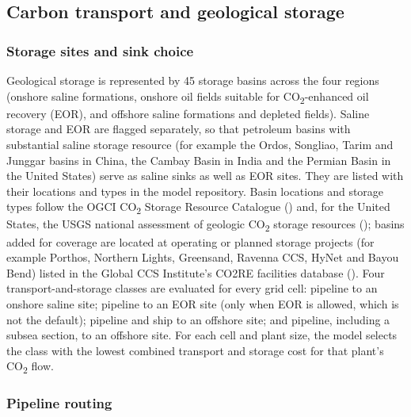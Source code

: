 \documentclass[
  letterpaper,
]{article}
\begin{document}
\subsection{Carbon transport and geological
storage}\label{carbon-transport-and-geological-storage}

\subsubsection{Storage sites and sink
choice}\label{storage-sites-and-sink-choice}

Geological storage is represented by 45 storage basins across the four
regions (onshore saline formations, onshore oil fields suitable for
CO\textsubscript{2}-enhanced oil recovery (EOR), and offshore saline
formations and depleted fields). Saline storage and EOR are flagged
separately, so that petroleum basins with substantial saline storage
resource (for example the Ordos, Songliao, Tarim and Junggar basins in
China, the Cambay Basin in India and the Permian Basin in the United
States) serve as saline sinks as well as EOR sites. They are listed with
their locations and types in the model repository. Basin locations and
storage types follow the OGCI CO\textsubscript{2} Storage Resource
Catalogue () and, for the United
States, the USGS national assessment of geologic CO\textsubscript{2}
storage resources (); basins added
for coverage are located at operating or planned storage projects (for
example Porthos, Northern Lights, Greensand, Ravenna CCS, HyNet and
Bayou Bend) listed in the Global CCS Institute's CO2RE facilities
database (). Four
transport-and-storage classes are evaluated for every grid cell:
pipeline to an onshore saline site; pipeline to an EOR site (only when
EOR is allowed, which is not the default); pipeline and ship to an
offshore site; and pipeline, including a subsea section, to an offshore
site. For each cell and plant size, the model selects the class with the
lowest combined transport and storage cost for that plant's
CO\textsubscript{2} flow.

\subsubsection{Pipeline routing}\label{pipeline-routing}
\end{document}
